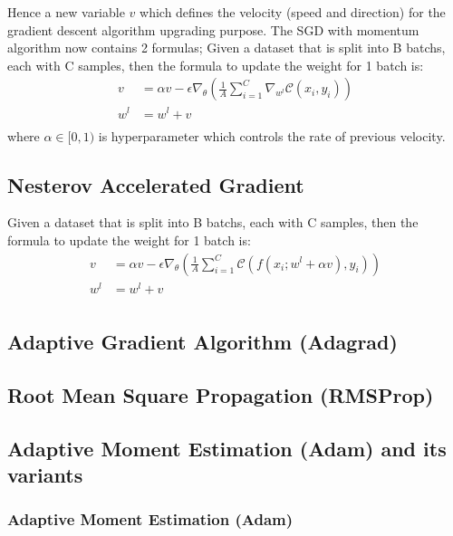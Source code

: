 Hence a new variable $v$ which defines the velocity (speed and direction) for the gradient descent algorithm upgrading purpose. The SGD with momentum algorithm now contains 2 formulas; Given a dataset that is split into B batchs, each with C samples, then the formula to update the weight for 1 batch is:
\begin{equation}
    \begin{aligned}
        v &= \alpha v - \epsilon \nabla_{\theta} \left( \frac{1}{A} \sum^{C}_{i=1} \nabla_{w^{l}} \mathcal{C}(x_{i},y_{i}) \right) \\
        w^{l} &= w^{l} + v\\
    \end{aligned}
\end{equation}
where $\alpha \in [0,1)$ is hyperparameter which controls the rate of previous velocity.
\subsection{Nesterov Accelerated Gradient}
Given a dataset that is split into B batchs, each with C samples, then the formula to update the weight for 1 batch is:
\begin{equation}
    \begin{aligned}
        v &= \alpha v - \epsilon \nabla_{\theta} \left( \frac{1}{A} \sum^{C}_{i=1} \mathcal{C}(f(x_{i};w^{l} + \alpha v),y_{i}) \right) \\
        w^{l} &= w^{l} + v\\
    \end{aligned}
\end{equation}
\subsection{Adaptive Gradient Algorithm (Adagrad)}

\subsection{Root Mean Square Propagation (RMSProp)}

\subsection{Adaptive Moment Estimation (Adam) and its variants}

\subsubsection{Adaptive Moment Estimation (Adam)}

